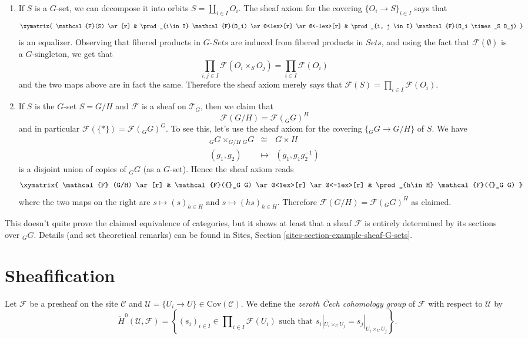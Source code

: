 \begin{enumerate}
\item
If $S$ is a $G$-set, we can decompose it into orbits $S = \coprod_{i\in I}
O_i$. The sheaf axiom for the covering $\{O_i \to S\}_{i\in I}$ says that
$$
\xymatrix{
\mathcal{F}(S) \ar[r] &
\prod_{i\in I} \mathcal{F}(O_i) \ar@<1ex>[r] \ar@<-1ex>[r] &
\prod_{i, j \in I} \mathcal{F}(O_i \times_S O_j)
}
$$
is an equalizer. Observing that fibered products in $G\textit{-Sets}$ are
induced from fibered products in $\textit{Sets}$, and using the fact that
$\mathcal{F}(\emptyset)$ is a $G$-singleton, we get that
$$
\prod_{i, j \in I} \mathcal{F}(O_i \times_S O_j) = \prod_{i \in I}
\mathcal{F}(O_i)
$$
and the two maps above are in fact the same. Therefore the sheaf axiom merely
says that $\mathcal{F}(S) = \prod_{i\in I} \mathcal{F}(O_i)$.
\item
If $S$ is the $G$-set $S= G/H$ and $\mathcal{F}$ is a sheaf on $\mathcal{T}_G$,
then we claim that
$$
\mathcal{F}(G/H) = \mathcal{F}({}_G G)^H
$$
and in particular $\mathcal{F}(\{*\}) = \mathcal{F}({}_G G)^G$. To see this,
let's use the sheaf axiom for the covering $\{ {}_G G \to G/H \}$ of $S$. We
have
\begin{eqnarray*}
{}_G G \times_{G/H} {}_G G & \cong & G \times H \\
(g_1, g_2) & \longmapsto & (g_1, g_1 g_2^{-1})
\end{eqnarray*}
is a disjoint union of copies of ${}_G G$ (as a $G$-set). Hence the sheaf axiom
reads
$$
\xymatrix{
\mathcal{F} (G/H) \ar[r] &
\mathcal{F}({}_G G) \ar@<1ex>[r] \ar@<-1ex>[r] &
\prod_{h\in H} \mathcal{F}({}_G G)
}
$$
where the two maps on the right are $s \mapsto (s)_{h \in H}$ and $s \mapsto
(hs)_{h \in H}$. Therefore $\mathcal{F}(G/H) = \mathcal{F}({}_G G)^H$ as
claimed.
\end{enumerate}
This doesn't quite prove the claimed equivalence of categories, but it shows at
least that a sheaf $\mathcal{F}$ is entirely determined by its sections over
${}_G G$. Details (and set theoretical remarks) can be found in
Sites, Section \ref{sites-section-example-sheaf-G-sets}.




\section{Sheafification}
\label{section-sheafification}

\begin{definition}
\label{definition-0-cech}
Let $\mathcal{F}$ be a presheaf on the site $\mathcal{C}$ and
$\mathcal{U} = \{U_i \to U\} \in \text{Cov} (\mathcal{C})$.
We define the {\it zeroth {\v C}ech cohomology group} of
$\mathcal{F}$ with respect to $\mathcal{U}$ by
$$
\check H^0 (\mathcal{U}, \mathcal{F}) =
\left\{
(s_i)_{i\in I} \in \prod\nolimits_{i\in I }\mathcal{F}(U_i)
\text{ such that }
s_i|_{U_i \times_U U_j} = s_j |_{U_i \times_U U_j}
\right\}.
$$
\end{definition}

